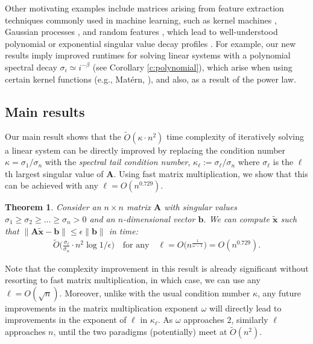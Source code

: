 \documentclass[11pt]{article}
\def\x{{\mathbf x}}
\def\b{{\mathbf b}}
\def\A{{\mathbf A}}
\newtheorem{thm}{Theorem}
\begin{document}
Other motivating examples include matrices arising from feature extraction techniques commonly used in machine learning, such as kernel machines \cite{Williams01Nystrom}, Gaussian processes \cite{RasmussenWilliams06}, and random features \cite{rahimi2007random}, which lead to well-understood polynomial or exponential singular value decay profiles \cite{burt2019rates,Santa97gaussianregression,RasmussenWilliams06}. For example, our new results imply improved runtimes for solving linear systems with a polynomial spectral decay $\sigma_i\simeq i^{-\beta}$ (see Corollary \ref{c:polynomial}), which arise when using certain kernel functions (e.g., Mat\'ern, \cite{RasmussenWilliams06}), and also, as a result of the power law.

\subsection{Main results}

Our main result shows that the $\tilde O(\kappa\cdot n^2)$ time complexity of iteratively solving a linear system can be directly improved by replacing the condition number $\kappa = \sigma_1/\sigma_n$ with the \emph{spectral tail condition number}, $\kappa_{\ell}:=\sigma_\ell/\sigma_n$ where $\sigma_\ell$ is the $\ell$th largest singular value of $\A$. Using fast matrix multiplication, we show that this can be achieved with any $\ell=O(n^{0.729})$.

\begin{thm}\label{t:informal-main}
    Consider an $n\times n$ matrix $\A$ with singular values $\sigma_1\geq \sigma_2\geq ...\geq\sigma_{n}>0$ and an $n$-dimensional vector $\b$. We can compute $\tilde\x$ such that $\|\A \tilde\x-\b\|\leq \epsilon\|\b\|$ in time:
    \begin{align*}
        \tilde O\bigg(\frac{\sigma_{\ell}}{\sigma_n}\cdot n^2\log1/\epsilon\bigg)\quad\text{for any}\quad \ell=O\big(n^{\frac1{\omega-1}}\big)=O(n^{0.729}).
    \end{align*}
\end{thm}
Note that the complexity improvement in this result is already significant without resorting to fast matrix multiplication, in which case, we can use any $\ell=O(\sqrt n)$. Moreover, unlike with the usual condition number $\kappa$, any future improvements in the matrix multiplication exponent $\omega$ will directly lead to improvements in the exponent of $\ell$ in $\kappa_\ell$. As $\omega$ approaches $2$, similarly $\ell$ approaches $n$, until the two paradigms (potentially) meet at $\tilde O(n^2)$.
\end{document}
